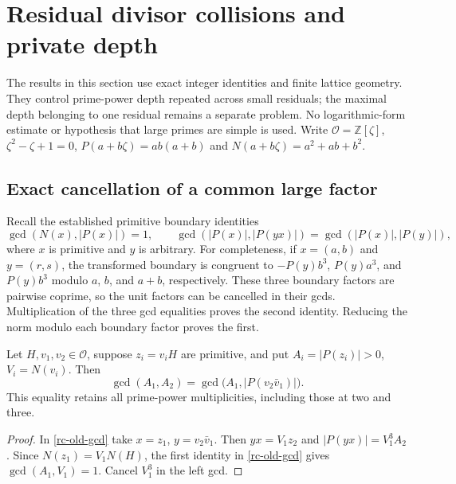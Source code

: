 \section{Residual divisor collisions and private depth}
\label{rc-section}
The results in this section use exact integer identities and finite lattice
geometry. They control prime-power depth repeated across small residuals;
the maximal depth belonging to one residual remains a separate problem.
No logarithmic-form estimate or hypothesis that large primes are simple is
used. Write $\mathcal O=\mathbb Z[\zeta]$, $\zeta^2-\zeta+1=0$,
$P(a+b\zeta)=ab(a+b)$ and $N(a+b\zeta)=a^2+ab+b^2$.

\subsection{Exact cancellation of a common large factor}
Recall the established primitive boundary identities
\begin{equation}\label{rc-old-gcd}
 \gcd(N(x),|P(x)|)=1,\qquad
 \gcd(|P(x)|,|P(yx)|)=\gcd(|P(x)|,|P(y)|),
\end{equation}
where $x$ is primitive and $y$ is arbitrary. For completeness, if $x=(a,b)$
and $y=(r,s)$, the transformed boundary is congruent to
$-P(y)b^3$, $P(y)a^3$, and $P(y)b^3$ modulo $a$, $b$, and $a+b$,
respectively. These three boundary factors are pairwise coprime, so the
unit factors can be cancelled in their gcds. Multiplication of the three
gcd equalities proves the second identity. Reducing the norm modulo each
boundary factor proves the first.

\begin{theorem}\label{rc-cross}
Let $H,v_1,v_2\in\mathcal O$, suppose $z_i=v_iH$ are primitive, and put
$A_i=|P(z_i)|>0$, $V_i=N(v_i)$. Then
\[
 \gcd(A_1,A_2)=\gcd\bigl(A_1,|P(v_2\bar v_1)|\bigr).
\]
This equality retains all prime-power multiplicities, including those at
two and three.
\end{theorem}
\begin{proof}
In \eqref{rc-old-gcd} take $x=z_1$, $y=v_2\bar v_1$.
Then $yx=V_1z_2$ and $|P(yx)|=V_1^3A_2$.
Since $N(z_1)=V_1N(H)$, the first identity in \eqref{rc-old-gcd}
gives $\gcd(A_1,V_1)=1$. Cancel $V_1^3$ in the left gcd.
\end{proof}

